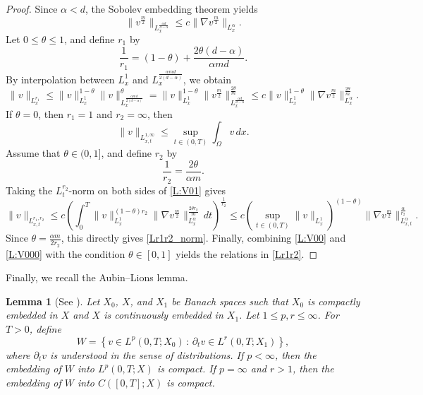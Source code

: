 \documentclass{amsart}
\newtheorem{lemma}[defn]{Lemma}
\numberwithin{equation}{section}
\begin{document}
\begin{proof}
Since $\alpha<d$, the Sobolev embedding theorem yields
\begin{equation*}\label{Sobolev}
\|v^{\frac{m}{2}}\|_{L_{x}^{\frac{\alpha d}{d-\alpha}}} \leq c \|\nabla v^{\frac{m}{2}}\|_{L_{x}^{\alpha}}.
\end{equation*}
Let $0 \leq \theta \leq 1$, and define $r_1$ by
	\begin{equation}\label{L:V00}
	\frac{1}{r_1} = (1-\theta) + \frac{2 \theta  (d-\alpha)}{\alpha md}.
	\end{equation}
By interpolation between $L_{x}^{1}$ and $L_{x}^{\frac{\alpha m d}{2(d-\alpha)}}$, we obtain 
\begin{equation}\label{L:V01}
			\|v\|_{L^{r_1}_{x}} \leq
			\|v\|_{L^1_x}^{1-\theta} \|v\|^{\theta}_{L_{x}^{\frac{\alpha md}{2(d-\alpha)}}}
			= \|v\|_{L^1_x}^{1-\theta} \|v^{\frac{m}{2}}\|^{\frac{2\theta}{m}}_{L_{x}^{\frac{\alpha d}{d-\alpha}}}
			\leq c \|v\|_{L^1_x}^{1-\theta} \|\nabla v^{\frac{m}{2}}\|^{\frac{2\theta}{m}}_{L_{x}^{\alpha}}.
\end{equation}
If $\theta =0$, then $r_1 = 1$ and $r_2 = \infty$, then 
\[
\|v\|_{L^{1,\infty}_{x,t}} \leq \sup_{t\in(0,T)} \int_{\Omega} v \,dx.
\]	
Assume that $\theta \in (0, 1]$, and define $r_2$ by
\begin{equation}\label{L:V000}
\frac{1}{r_2} = \frac{2\theta}{\alpha m}.
\end{equation}
Taking the $L_{t}^{r_2}$-norm on both sides of \eqref{L:V01} gives 	
\begin{equation}\label{L:V02}
\|v\|_{L^{r_1,r_2}_{x,t}}
	\leq c\left( \int_{0}^{T} \|v\|_{L^1_x}^{(1-\theta)r_2} \|\nabla v^{\frac{m}{2}}\|^{\frac{2\theta r_2}{m}}_{L_{x}^{\alpha}}
 \,dt\right)^{\frac{1}{r_2}}
 \leq c\left(\sup_{t\in (0, T)}\|v\|_{L^1_x}\right)^{(1-\theta)} \|\nabla v^{\frac{m}{2}}\|_{L_{x,t}^{\alpha}}^{\frac{\alpha}{r_2}}.
	\end{equation}
Since $\theta = \frac{\alpha m}{2 r_2}$, this directly gives \eqref{Lr1r2_norm}. Finally, combining \eqref{L:V00} and \eqref{L:V000} with the condition $\theta \in [0,1]$ yields the relations in \eqref{Lr1r2}.  
\end{proof}




Finally, we recall the Aubin--Lions lemma.

\begin{lemma}[See \cite{Sim87}]\label{AL}
Let $X_0$, $X$, and $X_1$ be Banach spaces such that $X_0$ is compactly embedded in $X$ and $X$ is continuously embedded in $X_1$.
Let $1\leq p,r \leq \infty$.
For $T>0$, define
\[
W = \left\{ v\in L^{p}(0,T;X_0) \,:\, \partial_t v\in L^{r}(0,T;X_1)\right\},
\]
where $\partial_t v$ is understood in the sense of distributions.
If $p<\infty$, then the embedding of $W$ into $L^{p}(0,T;X)$ is compact.
If $p=\infty$ and $r>1$, then the embedding of $W$ into $C([0,T];X)$ is compact.
\end{lemma}
\end{document}
